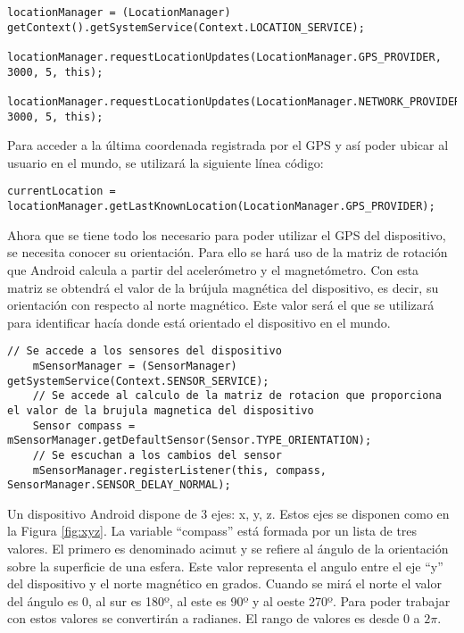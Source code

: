 \begin{lstlisting}[caption={Código para activar el GPS del dispositivo.}, label={lst:activarL}]
    locationManager = (LocationManager) getContext().getSystemService(Context.LOCATION_SERVICE);
    locationManager.requestLocationUpdates(LocationManager.GPS_PROVIDER, 3000, 5, this);
    locationManager.requestLocationUpdates(LocationManager.NETWORK_PROVIDER, 3000, 5, this);
\end{lstlisting}

Para acceder a la última coordenada registrada por el GPS y así poder ubicar al usuario en el mundo, se utilizará la siguiente línea código:

\begin{lstlisting}[caption={Código para acceder a la última ubicación registrada del GPS.}, label={lst:ubicacionL}]
    currentLocation = locationManager.getLastKnownLocation(LocationManager.GPS_PROVIDER);
\end{lstlisting}

Ahora que se tiene todo los necesario para poder utilizar el GPS del dispositivo, se necesita conocer su orientación. Para ello se hará uso de la matriz de rotación que Android calcula a partir del acelerómetro y el magnetómetro. Con esta matriz se obtendrá el valor de la brújula magnética del dispositivo, es decir, su orientación con respecto al norte magnético. Este valor será el que se utilizará para identificar hacía donde está orientado el dispositivo en el mundo.

\begin{lstlisting}[caption={Código para acceder a la última ubicación registrada del GPS.}, label={lst:ubicacionL}]
    // Se accede a los sensores del dispositivo
    mSensorManager = (SensorManager) getSystemService(Context.SENSOR_SERVICE); 
    // Se accede al calculo de la matriz de rotacion que proporciona el valor de la brujula magnetica del dispositivo
    Sensor compass = mSensorManager.getDefaultSensor(Sensor.TYPE_ORIENTATION);
    // Se escuchan a los cambios del sensor
    mSensorManager.registerListener(this, compass, SensorManager.SENSOR_DELAY_NORMAL);    
\end{lstlisting}
 
Un dispositivo Android dispone de 3 ejes: x, y, z. Estos ejes se disponen como en la Figura \ref{fig:xyz}. La variable ``compass'' está formada por un lista de tres valores. El primero es denominado acimut y se refiere al ángulo de la orientación sobre la superficie de una esfera. Este valor representa el angulo entre el eje ``y'' del dispositivo y el norte magnético en grados. Cuando se mirá el norte el valor del ángulo es 0, al sur es 180º, al este es 90º y al oeste 270º. Para poder trabajar con estos valores se convertirán a radianes.  El rango de valores es desde $0$ a $2\pi$.

